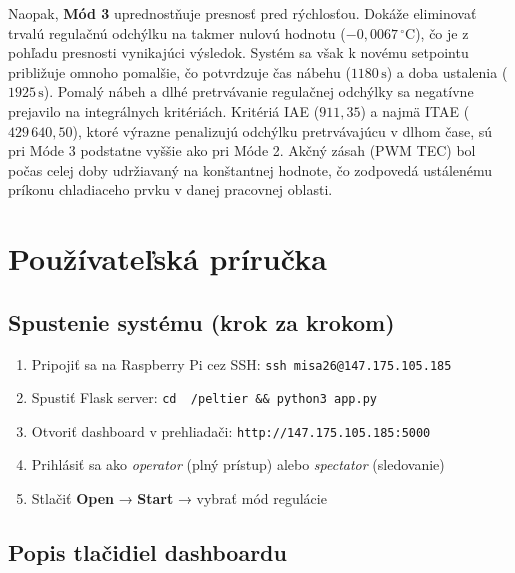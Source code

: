 Naopak, \textbf{Mód 3} uprednostňuje presnosť pred rýchlosťou. Dokáže eliminovať trvalú regulačnú odchýlku na takmer nulovú hodnotu ($-0{,}0067\,^\circ\text{C}$), čo je z pohľadu presnosti vynikajúci výsledok. Systém sa však k novému setpointu približuje omnoho pomalšie, čo potvrdzuje čas nábehu ($1180\,\text{s}$) a doba ustalenia ($1925\,\text{s}$). Pomalý nábeh a dlhé pretrvávanie regulačnej odchýlky sa negatívne prejavilo na integrálnych kritériách. Kritériá IAE ($911{,}35$) a najmä ITAE ($429\,640{,}50$), ktoré výrazne penalizujú odchýlku pretrvávajúcu v dlhom čase, sú pri Móde 3 podstatne vyššie ako pri Móde 2. Akčný zásah (PWM TEC) bol počas celej doby udržiavaný na konštantnej hodnote, čo zodpovedá ustálenému príkonu chladiaceho prvku v danej pracovnej oblasti.

\section{Používateľská príručka}

\subsection{Spustenie systému (krok za krokom)}

\begin{enumerate}
    \item Pripojiť sa na Raspberry Pi cez SSH: \texttt{ssh misa26@147.175.105.185}
    \item Spustiť Flask server: \texttt{cd ~/peltier \&\& python3 app.py}
    \item Otvoriť dashboard v prehliadači: \texttt{http://147.175.105.185:5000}
    \item Prihlásiť sa ako \textit{operator} (plný prístup) alebo \textit{spectator} (sledovanie)
    \item Stlačiť \textbf{Open} → \textbf{Start} → vybrať mód regulácie
\end{enumerate}

\subsection{Popis tlačidiel dashboardu}

